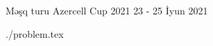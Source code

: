 \documentclass [11pt, a4paper, oneside] {article}
\begin{document}
\contest
{Məşq turu}%
{Azercell Cup 2021}%
{23 - 25 İyun 2021}%


\renewcommand{\t}{\texttt}


\graphicspath{{../../problems/a+b/statements/azerbaijani/}}
  \def\ProblemIndex{A}
{./problem.tex}

  
\end{document}
